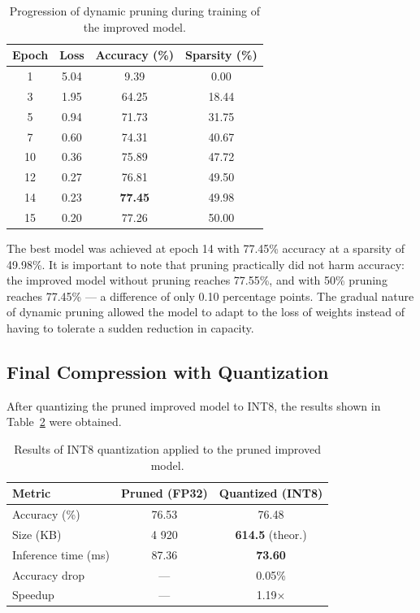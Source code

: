 \documentclass[letterpaper, 10 pt, conference]{ieeeconf}
\begin{document}
\begin{table}[h]
\caption{Progression of dynamic pruning during training of the improved model.}
\label{tab:pruning_progress}
\begin{center}
\begin{tabular}{cccc}
\toprule
\textbf{Epoch} & \textbf{Loss} & \textbf{Accuracy (\%)} & \textbf{Sparsity (\%)} \\
\midrule
1   & 5.04 &  9.39 & 0.00 \\
3   & 1.95 & 64.25 & 18.44 \\
5   & 0.94 & 71.73 & 31.75 \\
7   & 0.60 & 74.31 & 40.67 \\
10  & 0.36 & 75.89 & 47.72 \\
12  & 0.27 & 76.81 & 49.50 \\
14  & 0.23 & \textbf{77.45} & 49.98 \\
15  & 0.20 & 77.26 & 50.00 \\
\bottomrule
\end{tabular}
\end{center}
\end{table}

The best model was achieved at epoch 14 with 77.45\% accuracy at a sparsity of 49.98\%.
It is important to note that pruning practically did not harm accuracy: the improved model without pruning reaches 77.55\%, and with 50\% pruning reaches 77.45\% --- a difference of only 0.10 percentage points.
The gradual nature of dynamic pruning allowed the model to adapt to the loss of weights instead of having to tolerate a sudden reduction in capacity.

\subsection{Final Compression with Quantization}

After quantizing the pruned improved model to INT8, the results shown in Table~\ref{tab:quant} were obtained.

\begin{table}[h]
\caption{Results of INT8 quantization applied to the pruned improved model.}
\label{tab:quant}
\begin{center}
\begin{tabular}{lcc}
\toprule
\textbf{Metric} & \textbf{Pruned (FP32)} & \textbf{Quantized (INT8)} \\
\midrule
Accuracy (\%)         & 76.53 & 76.48 \\
Size (KB)             & 4 920 & \textbf{614.5} (theor.) \\
Inference time (ms)   & 87.36 & \textbf{73.60} \\
\midrule
Accuracy drop         & --- & 0.05\% \\
Speedup               & --- & 1.19$\times$ \\
\bottomrule
\end{tabular}
\end{center}
\end{table}
\end{document}
